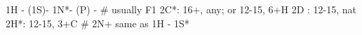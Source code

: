 1H - (1S)- 1N*- (P) -  # usually F1
2C*: 16+, any; or 12-15, 6+H
2D : 12-15, nat
2H*: 12-15, 3+C
# 2N+ same as 1H - 1S*